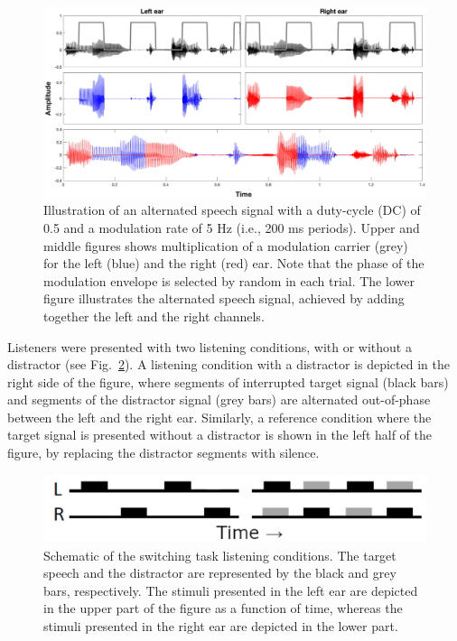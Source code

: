 \documentclass[a4paper, twoside]{templates/ociamthesis}
\begin{document}
\begin{figure}[ht]
\center
\includegraphics[width=\textwidth]{figures/Chapt1/AlternatedExample_ST.PNG}
\caption{\label{fig:Alternated}{Illustration of an alternated speech signal with a duty-cycle (DC) of 0.5 and a modulation rate of 5 Hz (i.e., 200 ms periods). Upper and middle figures shows multiplication of a modulation carrier (grey) for the left (blue) and the right (red) ear. Note that the phase of the modulation envelope is selected by random in each trial. The lower figure illustrates the alternated speech signal, achieved by adding together the left and the right channels.}}
\end{figure}

Listeners were presented with two listening conditions, with or without a distractor (see Fig.~\ref{fig:ST_ListeningConditions}). A listening condition with a distractor is depicted in the right side of the figure, where segments of interrupted target signal (black bars) and segments of the distractor signal (grey bars) are alternated out-of-phase between the left and the right ear. Similarly, a reference condition where the target signal is presented without a distractor is shown in the left half of the figure, by replacing the distractor segments with silence.\\

\begin{figure}[ht]
\center
\includegraphics[scale=.5]{figures/Chapt1/ST_conditions.PNG}
\caption{\label{fig:ST_ListeningConditions}{Schematic of the switching task listening conditions. The target speech and the distractor are represented by the black and grey bars, respectively. The stimuli presented in the left ear are depicted in the upper part of the figure as a function of time, whereas the stimuli presented in the right ear are depicted in the lower part.}}
\end{figure}
\end{document}
